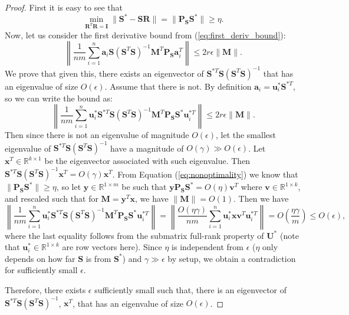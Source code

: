 \documentclass[twoside,11pt]{article}
\newcommand{\md}[1]{\mathbb{#1}}
\begin{document}
\begin{proof}
	First it is easy to see that
	\begin{equation}
	\min_{\bm{R}^T\bm{R}=\bm{I}}\|\bm{S}^*-\bm{S}\bm{R}\|  =\|\bm{P}_{\bm{S}}\bm{S}^*\|\geq \eta. \label{eq:nonoptimality}
	\end{equation}
	Now, let us consider the first derivative bound from (\ref{eq:first_deriv_bound}):
	\begin{equation*}
	\left\|\frac{1}{nm} \sum_{i=1}^n \bm{a}_i\bm{S}(\bm{S}^T\bm{S})^{-1}\bm{M}^T\bm{P}_{\bm{S}}\bm{a}_i^T\right\|\leq 2r\epsilon \|\bm{M}\|.
	\end{equation*}
	We  prove that given this, there exists an eigenvector of $\bm{S}^{*T}\bm{S}(\bm{S}^T\bm{S})^{-1}$ that has an eigenvalue of size $O(\epsilon)$. Assume that there is not. 
	By definition $\bm{a}_i=\bm{u}_i^*\bm{S}^{*T}$, so we can write the bound as:
	\begin{equation}
	\left\|\frac{1}{nm} \sum_{i=1}^n \bm{u}_i^*\bm{S}^{*T}\bm{S}(\bm{S}^T\bm{S})^{-1}\bm{M}^T\bm{P}_{\bm{S}}\bm{S}^{*}\bm{u}_i^{*T}\right\|\leq 2r\epsilon \|\bm{M}\|.\label{eq:first_deriv_term_1}
	\end{equation}
	Then since there is not an eigenvalue of magnitude $O(\epsilon)$, let the smallest eigenvalue of $\bm{S}^{*T}\bm{S}(\bm{S}^T\bm{S})^{-1}$ have a magnitude of $O(\gamma)\gg O(\epsilon)$. Let $\bm{x}^T \in \md{R}^{k \times 1}$ be the eigenvector associated with such eigenvalue. Then $\bm{S}^{*T}\bm{S}(\bm{S}^T\bm{S})^{-1}\bm{x}^T=O(\gamma)\bm{x}^T$.   From Equation (\ref{eq:nonoptimality}) we know that $\|\bm{P}_{\bm{S}}\bm{S}^*\|\geq \eta$, so let $\bm{y}\in \md{R}^{1 \times m}$ be such that $\bm{y}\bm{P}_{\bm{S}}\bm{S}^*=O(\eta)\bm{v}^T$ where $\bm{v} \in \md{R}^{1 \times k}$, and rescaled such that for $\bm{M}=\bm{y}^T\bm{x}$, we have $\|\bm{M}\|=O(1)$. Then we have
	\begin{equation*}
	\left\|\frac{1}{nm} \sum_{i=1}^n \bm{u}_i^*\bm{S}^{*T}\bm{S}(\bm{S}^T\bm{S})^{-1}\bm{M}^T\bm{P}_{\bm{S}}\bm{S}^{*}\bm{u}_i^{*T}\right\|= \left\|\frac{O(\eta\gamma)}{nm} \sum_{i=1}^n \bm{u}_i^*\bm{x}\bm{v}^T\bm{u}_i^{*T}\right\|=O\left(\frac{\eta\gamma}{m}\right)\leq O(\epsilon),
	\end{equation*}
	where the last equality follows from the submatrix full-rank property of $\bm{U}^*$ (note that $\bm{u}_i^* \in \md{R}^{1 \times k}$ are row vectors here). Since $\eta$ is independent from $\epsilon$ ($\eta$ only depends on how far $\bm{S}$ is from $\bm{S}^*$) and $\gamma \gg \epsilon$ by setup, we obtain    a contradiction for sufficiently small $\epsilon$.
	
	Therefore, there exists $\epsilon$ sufficiently small such that, there is an eigenvector of $\bm{S}^{*T}\bm{S}(\bm{S}^T\bm{S})^{-1}$, $\bm{x}^T$, that has an eigenvalue of size $O(\epsilon)$.
\end{proof}
\end{document}
